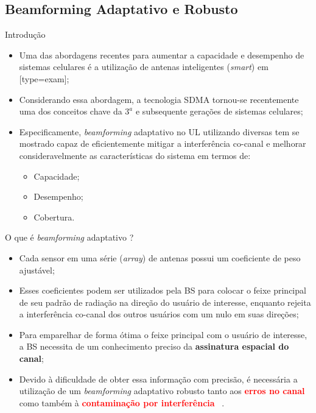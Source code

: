 \subsection{Beamforming Adaptativo e Robusto}

\begin{frame}{Introdução}
		\begin{itemize}
		\item Uma das abordagens recentes para aumentar a capacidade e desempenho de sistemas celulares é a utilização de antenas inteligentes (\textit{smart}) em [type=exam];
		\item Considerando essa abordagem, a tecnologia SDMA tornou-se recentemente uma dos conceitos chave da $3^a$ e subsequente gerações de sistemas celulares;
		\item Especificamente, \textit{beamforming} adaptativo no UL utilizando diversas tem se mostrado capaz de eficientemente mitigar a interferência co-canal e melhorar consideravelmente as características do sistema em termos de:
		\begin{itemize}
		  \item Capacidade;
		  \item Desempenho;
		  \item Cobertura.
		\end{itemize}
		\end{itemize}
\end{frame}

\begin{frame}{O que é \textit{beamforming} adaptativo ?}
	\begin{itemize}
		\item Cada sensor em uma série (\textit{array}) de antenas possui um coeficiente de peso ajustável;
		\item Esses coeficientes podem ser utilizados pela BS para colocar o feixe principal de seu padrão de radiação na direção do usuário de interesse, enquanto rejeita a interferência co-canal dos outros usuários com um nulo em suas direções;
		\item Para emparelhar de forma ótima o feixe principal com o usuário de interesse, a BS necessita de um conhecimento preciso da \textbf{assinatura espacial do canal};
		\item Devido à dificuldade de obter essa informação com precisão, é necessária a utilização de um \textit{beamforming} adaptativo robusto tanto aos \textcolor{red}{\textbf{erros no canal}} como também à \textcolor{red}{\textbf{contaminação por interferência}}~\cite[Cap. 6]{Trees2002} \cite[Cap.9]{Kaiser2005}.
	\end{itemize}
\end{frame}

